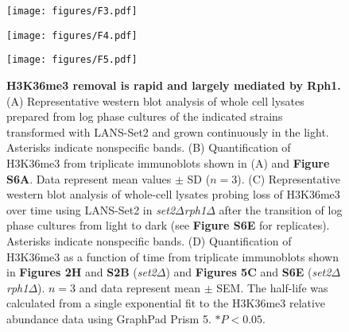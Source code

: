 \documentclass[12pt]{biorxiv}
\newcommand{\setdelt}{\emph{set2$\Delta$}\xspace}
\newcommand{\setdeltrphdelt}{\emph{set2$\Delta$rph1$\Delta$}\xspace}
\begin{document}
\begin{spacing}{2}
\begin{figure}
\center
\texttt{[image: figures/F3.pdf]}
\vspace*{2mm}
\caption{}
\end{figure}

\begin{figure}
\center
\texttt{[image: figures/F4.pdf]}
\vspace*{2mm}
\caption{}
\end{figure}

\begin{figure}
\center
\texttt{[image: figures/F5.pdf]}
\vspace*{2mm}
\caption{\textbf{H3K36me3 removal is rapid and largely mediated by Rph1.} (A) Representative western blot analysis of whole cell lysates prepared from log phase cultures of the indicated strains transformed with LANS-Set2 and grown continuously in the light. Asterisks indicate nonspecific bands. (B) Quantification of H3K36me3 from triplicate immunoblots shown in (A) and \textbf{Figure S6A}. Data represent mean values $\pm$ SD ($n = 3$). (C) Representative western blot analysis of whole-cell lysates probing loss of H3K36me3 over time using LANS-Set2 in \setdeltrphdelt after the transition of log phase cultures from light to dark (see \textbf{Figure S6E} for replicates). Asterisks indicate nonspecific bands. (D) Quantification of H3K36me3 as a function of time from triplicate immunoblots shown in \textbf{Figures 2H} and \textbf{S2B} (\setdelt) and \textbf{Figures 5C} and \textbf{S6E} (\setdeltrphdelt). $n = 3$ and data represent mean $\pm$ SEM.  The half-life was calculated from a single exponential fit to the H3K36me3 relative abundance data using GraphPad Prism 5. $\ast P < 0.05$.}
\end{figure}



%
%
%
%




\end{spacing}


%
%
%
%
\newpage
%


\end{document}
